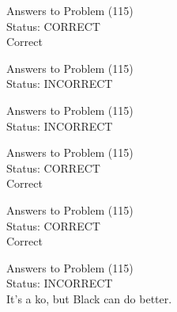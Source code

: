 \documentclass[11pt]{article}
\begin{document}
\begin{minipage}[t]{0.5\textwidth}
  {\centering
  
  Answers to Problem (115)\\
  Status: CORRECT\\
  Correct\\
  }
\end{minipage}
\begin{minipage}[t]{0.5\textwidth}
  {\centering
  
  Answers to Problem (115)\\
  Status: INCORRECT\\
  
  }
\end{minipage}
\begin{minipage}[t]{0.5\textwidth}
  {\centering
  
  Answers to Problem (115)\\
  Status: INCORRECT\\
  
  }
\end{minipage}
\begin{minipage}[t]{0.5\textwidth}
  {\centering
  
  Answers to Problem (115)\\
  Status: CORRECT\\
  Correct\\
  }
\end{minipage}
\begin{minipage}[t]{0.5\textwidth}
  {\centering
  
  Answers to Problem (115)\\
  Status: CORRECT\\
  Correct\\
  }
\end{minipage}
\begin{minipage}[t]{0.5\textwidth}
  {\centering
  
  Answers to Problem (115)\\
  Status: INCORRECT\\
  It's a ko, but Black can do better.\\
  }
\end{minipage}
\end{document}

